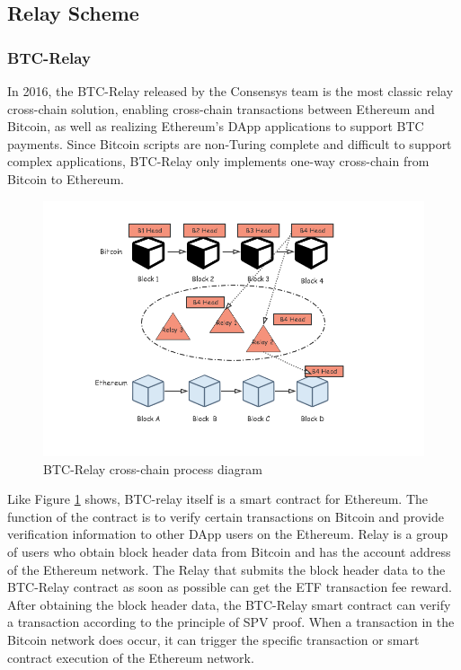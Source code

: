 \subsection{Relay Scheme}
\subsubsection{BTC-Relay}
\noindent In 2016, the BTC-Relay released by the Consensys team is the most classic relay cross-chain solution, enabling cross-chain transactions between Ethereum and Bitcoin, as well as realizing Ethereum's DApp applications to support BTC payments. Since Bitcoin scripts are non-Turing complete and difficult to support complex applications, BTC-Relay only implements one-way cross-chain from Bitcoin to Ethereum.
        \begin{figure}[htb!]
        \includegraphics[width=1\textwidth]{./figures/btc.png}
        \centering
        \caption{BTC-Relay cross-chain process diagram}%
        \centering
        \label{fig:btc}
        \end{figure}
\noindent Like Figure \ref{fig:btc} shows, BTC-relay itself is a smart contract for Ethereum. The function of the contract is to verify certain transactions on Bitcoin and provide verification information to other DApp users on the Ethereum. Relay is a group of users who obtain block header data from Bitcoin and has the account address of the Ethereum network. The Relay that submits the block header data to the BTC-Relay contract as soon as possible can get the ETF transaction fee reward. After obtaining the block header data, the BTC-Relay smart contract can verify a transaction according to the principle of SPV proof. When a transaction in the Bitcoin network does occur, it can trigger the specific transaction or smart contract execution of the Ethereum network.

